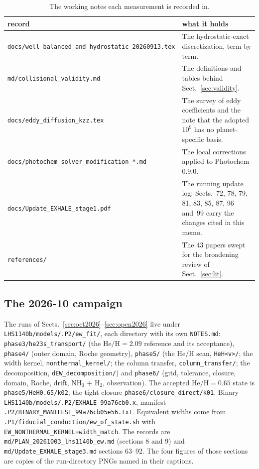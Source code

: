 \documentclass[english,a4paper]{my_memo}
\begin{document}
\begin{table}[htbp]\centering\small
\caption{The working notes each measurement is recorded in.}
\begin{tabular}{l>{\raggedright\arraybackslash}p{}}
\toprule
record & what it holds \\
\midrule
\texttt{docs/well\_balanced\_and\_hydrostatic\_20260913.tex} & The
hydrostatic-exact discretization, term by term. \\
\texttt{md/collisional\_validity.md} & The definitions and tables behind
Sect.~\ref{sec:validity}. \\
\texttt{docs/eddy\_diffusion\_kzz.tex} & The survey of eddy coefficients and
the note that the adopted $10^{9}$ has no planet-specific basis. \\
\texttt{docs/photochem\_solver\_modification\_*.md} & The local corrections
applied to Photochem 0.9.0. \\
\texttt{docs/Update\_EXHALE\_stage1.pdf} & The running update log; Sects.~72,
78, 79, 81, 83, 85, 87, 96 and~99 carry the changes cited in this memo. \\
\texttt{references/} & The 43 papers swept for the broadening review of
Sect.~\ref{sec:lit}. \\
\bottomrule
\end{tabular}
\end{table}
\subsection{The 2026-10 campaign}
\label{app:oct2026}

\begin{sloppypar}
The runs of Sects.~\ref{sec:oct2026}--\ref{sec:open2026} live under
\texttt{LHS1140b/models/.P2/ew\_fit/}, each directory with its own
\texttt{NOTES.md}: \texttt{phase3/he23s\_transport/} (the
$\mathrm{He/H} = 2.09$ reference and its acceptance), \texttt{phase4/}
(outer domain, Roche geometry), \texttt{phase5/} (the He/H scan,
\texttt{HeH<v>/}; the width kernel, \texttt{nonthermal\_kernel/}; the column
transfer, \texttt{column\_transfer/}; the decomposition,
\texttt{dEW\_decomposition/}) and \texttt{phase6/} (grid, tolerance,
closure, domain, Roche, drift, NH$_3$ + H$_2$, observation). The accepted
$\mathrm{He/H} = 0.65$ state is \texttt{phase5/HeH0.65/k02}, the tight
closure \texttt{phase6/closure\_direct/k01}. Binary
\texttt{LHS1140b/models/.P2/EXHALE\_99a76cb0.x}, manifest
\texttt{.P2/BINARY\_MANIFEST\_99a76cb05e56.txt}. Equivalent widths come from
\texttt{.P1/fiducial\_conduction/ew\_of\_state.sh} with
\texttt{EW\_NONTHERMAL\_KERNEL=width\_match}. The records are
\texttt{md/PLAN\_20261003\_lhs1140b\_ew.md} (sections 8 and 9) and
\texttt{md/Update\_EXHALE\_stage3.md} sections 63--92. The four figures of
those sections are copies of the run-directory PNGs named in their
captions.
\end{sloppypar}
\end{document}
